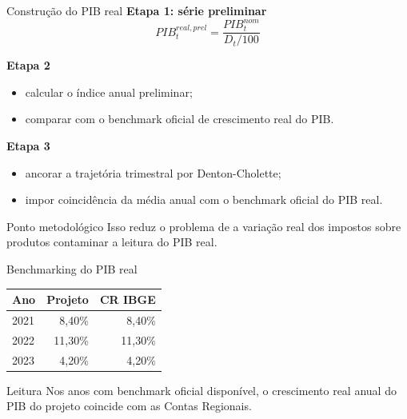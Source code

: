 \documentclass[aspectratio=169,11pt]{beamer}
\begin{document}
\begin{frame}{Construção do PIB real}
\textbf{Etapa 1: série preliminar}
\[
PIB_t^{real,prel} = \frac{PIB_t^{nom}}{D_t/100}
\]

\textbf{Etapa 2}
\begin{itemize}
  \item calcular o índice anual preliminar;
  \item comparar com o benchmark oficial de crescimento real do PIB.
\end{itemize}

\textbf{Etapa 3}
\begin{itemize}
  \item ancorar a trajetória trimestral por Denton-Cholette;
  \item impor coincidência da média anual com o benchmark oficial do PIB real.
\end{itemize}

\begin{block}{Ponto metodológico}
Isso reduz o problema de a variação real dos impostos sobre produtos contaminar a leitura do PIB real.
\end{block}
\end{frame}

\begin{frame}{Benchmarking do PIB real}
\centering
\begin{tabular}{lrr}
\toprule
\textbf{Ano} & \textbf{Projeto} & \textbf{CR IBGE} \\
\midrule
2021 & 8,40\% & 8,40\% \\
2022 & 11,30\% & 11,30\% \\
2023 & 4,20\% & 4,20\% \\
\bottomrule
\end{tabular}

\vspace{0.4cm}
\begin{block}{Leitura}
Nos anos com benchmark oficial disponível, o crescimento real anual do PIB do projeto coincide com as Contas Regionais.
\end{block}
\end{frame}
\end{document}
